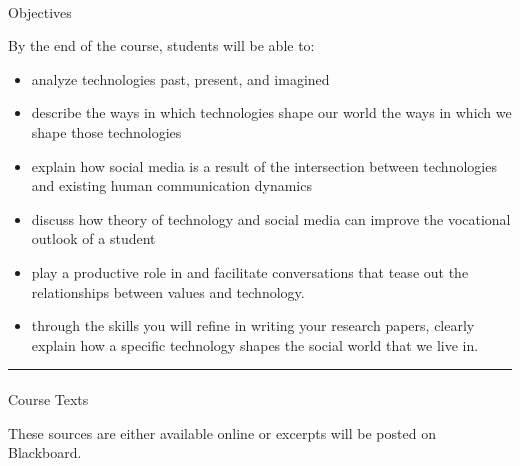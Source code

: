 \documentclass[
  letterpaper,
  DIV=11,
  numbers=noendperiod,
  oneside]{scrartcl}
\makeatletter
\let\oldparagraph\paragraph
\renewcommand{\paragraph}{
    \@ifstar
      \xxxParagraphStar
      \xxxParagraphNoStar
  }
\newcommand{\xxxParagraphStar}[1]{\oldparagraph*{#1}\mbox{}}
\newcommand{\xxxParagraphNoStar}[1]{\oldparagraph{#1}\mbox{}}
\providecommand{\tightlist}{%
  \setlength{\itemsep}{0pt}\setlength{\parskip}{0pt}}\usepackage{longtable,booktabs,array}
\makeatother
\begin{document}
\paragraph{Objectives}\label{objectives}

By the end of the course, students will be able to:

\begin{itemize}
\tightlist
\item
  analyze technologies past, present, and imagined
\item
  describe the ways in which technologies shape our world the ways in
  which we shape those technologies
\item
  explain how social media is a result of the intersection between
  technologies and existing human communication dynamics
\item
  discuss how theory of technology and social media can improve the
  vocational outlook of a student
\item
  play a productive role in and facilitate conversations that tease out
  the relationships between values and technology.\\
\item
  through the skills you will refine in writing your research papers,
  clearly explain how a specific technology shapes the social world that
  we live in.
\end{itemize}

\begin{center}\rule{0.5\linewidth}{0.5pt}\end{center}

\paragraph{Course Texts}\label{course-texts}

These sources are either available online or excerpts will be posted on
Blackboard.
\end{document}
